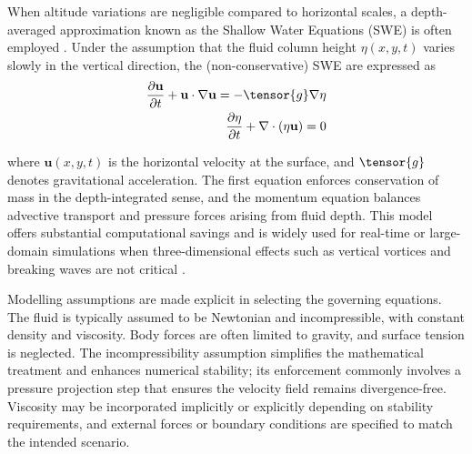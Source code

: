 When altitude variations are negligible compared to horizontal scales, a depth-averaged approximation known as the Shallow Water Equations (SWE) is often employed \cite{Parna2019}. Under the assumption that the fluid column height $\eta(x,y,t)$ varies slowly in the vertical direction, the (non-conservative) SWE are expressed as
\begin{align}
    \frac{\partial \mathbf{u}}{\partial t} + \mathbf{u} \cdot \nabla \mathbf{u} = - \tensor{g} \nabla \eta \\
    \frac{\partial \eta}{\partial t} + \nabla\cdot(\eta \mathbf{u}) = 0
\end{align}

where $\mathbf{u}(x,y,t)$ is the horizontal velocity at the surface, and $\tensor{g}$ denotes gravitational acceleration.
The first equation enforces conservation of mass in the depth-integrated sense, and the momentum equation balances advective transport and pressure forces arising from fluid depth.
This model offers substantial computational savings and is widely used for real-time or large-domain simulations when three-dimensional effects such as vertical vortices and breaking waves are not critical \cite{Parna2019}.

Modelling assumptions are made explicit in selecting the governing equations. The fluid is typically assumed to be Newtonian and incompressible, with constant density and viscosity. Body forces are often limited to gravity, and surface tension is neglected.
The incompressibility assumption simplifies the mathematical treatment and enhances numerical stability; its enforcement commonly involves a pressure projection step that ensures the velocity field remains divergence-free. Viscosity may be incorporated implicitly or explicitly depending on stability requirements, and external forces or boundary conditions are specified to match the intended scenario.



